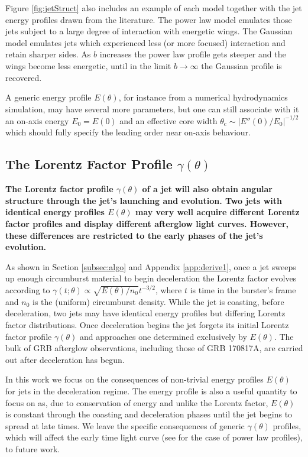 \documentclass[twocolumn]{aastex62}
\newcommand{\grbbns}{GRB 170817A}
\newcommand{\thC}{\ensuremath{\theta_{\mathrm{c}}}}
\begin{document}
Figure \ref{fig:jetStruct} also includes an example of each model together with the jet energy profiles drawn from the literature.  The power law model emulates those jets subject to a large degree of interaction with energetic wings.  The Gaussian model emulates jets which experienced less (or more focused) interaction and retain sharper sides.  As $b$ increases the power law profile gets steeper and the wings become less energetic, until in the limit $b\to \infty$ the Gaussian profile is recovered.

A generic energy profile $E(\theta)$, for instance from a numerical hydrodynamics simulation, may have several more parameters, but one can still associate with it an on-axis energy $E_0 = E(0)$ and an effective core width $\thC \sim |E''(0)/E_0|^{-1/2}$ which should fully specify the leading order near on-axis behaviour.  

\subsection{The Lorentz Factor Profile $\gamma(\theta)$}

{\bf 
The Lorentz factor profile $\gamma(\theta)$ of a jet will also obtain angular structure through the jet's launching and evolution.  Two jets with identical energy profiles $E(\theta)$ may very well acquire different Lorentz factor profiles and display different afterglow light curves.  However, these differences are restricted to the early phases of the jet's evolution.

As shown in Section \ref{subsec:algo} and Appendix \ref{app:derive1}, once a jet sweeps up enough circumburst material to begin deceleration the Lorentz factor evolves according to $\gamma(t; \theta) \propto \sqrt{E(\theta) / n_0} t^{-3/2}$, where $t$ is time in the burster's frame and $n_0$ is the (uniform) circumburst density.   While the jet is coasting, before deceleration, two jets may have identical energy profiles but differing Lorentz factor distributions.  Once deceleration begins the jet forgets its initial Lorentz factor profile $\gamma(\theta)$ and approaches one determined exclusively by $E(\theta)$.  The bulk of GRB afterglow observations, including those of \grbbns{}, are carried out after deceleration has begun.

 In this work we focus on the consequences of non-trivial energy profiles $E(\theta)$ for jets in the deceleration regime.  The energy profile is also a useful quantity to focus on as, due to conservation of energy and unlike the Lorentz factor, $E(\theta)$ is constant through the coasting and deceleration phases until the jet begins to spread at late times.  We leave the specific consequences of generic $\gamma(\theta)$ profiles, which will affect the early time light curve (see \cite{Beniamini:2020ab} for the case of power law profiles), to future work. 
}
\end{document}
